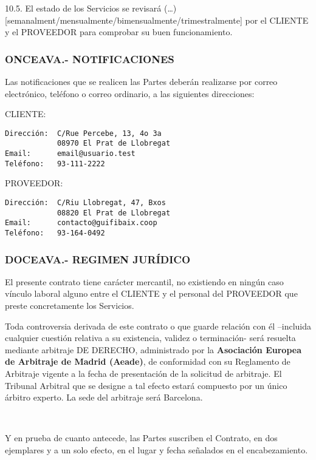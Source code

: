 \documentclass['12pt',spanish,a4paper,]{article}
\begin{document}
10.5. El estado de los Servicios se revisará (\ldots{})
{[}semanalment/mensualmente/bimensualmente/trimestralmente{]} por el
CLIENTE y el PROVEEDOR para comprobar su buen funcionamiento.

\subsubsection{ONCEAVA.- NOTIFICACIONES}\label{onceava.--notificaciones}

Las notificaciones que se realicen las Partes deberán realizarse por
correo electrónico, teléfono o correo ordinario, a las siguientes
direcciones:

CLIENTE:

\begin{verbatim}
Dirección:  C/Rue Percebe, 13, 4o 3a
            08970 El Prat de Llobregat
Email:      email@usuario.test
Teléfono:   93-111-2222
\end{verbatim}

PROVEEDOR:

\begin{verbatim}
Dirección:  C/Riu Llobregat, 47, Bxos
            08820 El Prat de Llobregat
Email:      contacto@guifibaix.coop
Teléfono:   93-164-0492
\end{verbatim}

\subsubsection{DOCEAVA.- REGIMEN
JURÍDICO}\label{doceava.--regimen-juruxeddico}

El presente contrato tiene carácter mercantil, no existiendo en ningún
caso vínculo laboral alguno entre el CLIENTE y el personal del PROVEEDOR
que preste concretamente los Servicios.

Toda controversia derivada de este contrato o que guarde relación con él
--incluida cualquier cuestión relativa a su existencia, validez o
terminación- será resuelta mediante arbitraje DE DERECHO, administrado
por la \textbf{Asociación Europea de Arbitraje de Madrid (Aeade)}, de
conformidad con su Reglamento de Arbitraje vigente a la fecha de
presentación de la solicitud de arbitraje. El Tribunal Arbitral que se
designe a tal efecto estará compuesto por un único árbitro experto. La
sede del arbitraje será Barcelona.

~

Y en prueba de cuanto antecede, las Partes suscriben el Contrato, en dos
ejemplares y a un solo efecto, en el lugar y fecha señalados en el
encabezamiento.
\end{document}
